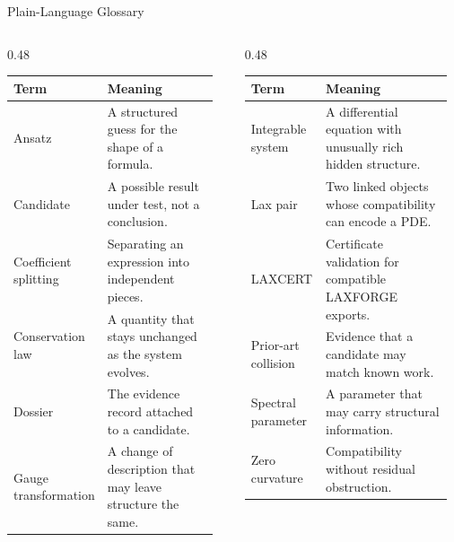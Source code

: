 \documentclass[aspectratio=169,11pt]{beamer}
\begin{document}
\begin{frame}{Plain-Language Glossary}
  \scriptsize
  \begin{columns}[T,totalwidth=\textwidth]
    \begin{column}{0.48\textwidth}
      \begin{tabular}{@{}p{0.32\linewidth}p{0.62\linewidth}@{}}
        \toprule
        \textbf{Term} & \textbf{Meaning} \\
        \midrule
        Ansatz & A structured guess for the shape of a formula. \\
        Candidate & A possible result under test, not a conclusion. \\
        Coefficient splitting & Separating an expression into independent pieces. \\
        Conservation law & A quantity that stays unchanged as the system evolves. \\
        Dossier & The evidence record attached to a candidate. \\
        Gauge transformation & A change of description that may leave structure the same. \\
        \bottomrule
      \end{tabular}
    \end{column}
    \begin{column}{0.48\textwidth}
      \begin{tabular}{@{}p{0.32\linewidth}p{0.62\linewidth}@{}}
        \toprule
        \textbf{Term} & \textbf{Meaning} \\
        \midrule
        Integrable system & A differential equation with unusually rich hidden structure. \\
        Lax pair & Two linked objects whose compatibility can encode a PDE. \\
        LAXCERT & Certificate validation for compatible LAXFORGE exports. \\
        Prior-art collision & Evidence that a candidate may match known work. \\
        Spectral parameter & A parameter that may carry structural information. \\
        Zero curvature & Compatibility without residual obstruction. \\
        \bottomrule
      \end{tabular}
    \end{column}
  \end{columns}
\end{frame}
\end{document}
